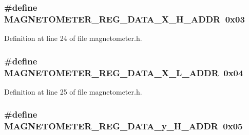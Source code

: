 \subsubsection[{\texorpdfstring{M\+A\+G\+N\+E\+T\+O\+M\+E\+T\+E\+R\+\_\+\+R\+E\+G\+\_\+\+D\+A\+T\+A\+\_\+\+X\+\_\+\+H\+\_\+\+A\+D\+DR}{MAGNETOMETER_REG_DATA_X_H_ADDR}}]{\setlength{\rightskip}{0pt plus 5cm}\#define M\+A\+G\+N\+E\+T\+O\+M\+E\+T\+E\+R\+\_\+\+R\+E\+G\+\_\+\+D\+A\+T\+A\+\_\+\+X\+\_\+\+H\+\_\+\+A\+D\+DR~0x03}\hypertarget{group___magnetometer_ga38f670a1d421420dd11e231787a0bc09}{}\label{group___magnetometer_ga38f670a1d421420dd11e231787a0bc09}


Definition at line 24 of file magnetometer.\+h.

\subsubsection[{\texorpdfstring{M\+A\+G\+N\+E\+T\+O\+M\+E\+T\+E\+R\+\_\+\+R\+E\+G\+\_\+\+D\+A\+T\+A\+\_\+\+X\+\_\+\+L\+\_\+\+A\+D\+DR}{MAGNETOMETER_REG_DATA_X_L_ADDR}}]{\setlength{\rightskip}{0pt plus 5cm}\#define M\+A\+G\+N\+E\+T\+O\+M\+E\+T\+E\+R\+\_\+\+R\+E\+G\+\_\+\+D\+A\+T\+A\+\_\+\+X\+\_\+\+L\+\_\+\+A\+D\+DR~0x04}\hypertarget{group___magnetometer_ga98ab0f7fffb8804d54a292997b8a64c1}{}\label{group___magnetometer_ga98ab0f7fffb8804d54a292997b8a64c1}


Definition at line 25 of file magnetometer.\+h.

\subsubsection[{\texorpdfstring{M\+A\+G\+N\+E\+T\+O\+M\+E\+T\+E\+R\+\_\+\+R\+E\+G\+\_\+\+D\+A\+T\+A\+\_\+y\+\_\+\+H\+\_\+\+A\+D\+DR}{MAGNETOMETER_REG_DATA_y_H_ADDR}}]{\setlength{\rightskip}{0pt plus 5cm}\#define M\+A\+G\+N\+E\+T\+O\+M\+E\+T\+E\+R\+\_\+\+R\+E\+G\+\_\+\+D\+A\+T\+A\+\_\+y\+\_\+\+H\+\_\+\+A\+D\+DR~0x05}\hypertarget{group___magnetometer_ga815d948184315b9a645f5825006e2efd}{}\label{group___magnetometer_ga815d948184315b9a645f5825006e2efd}


